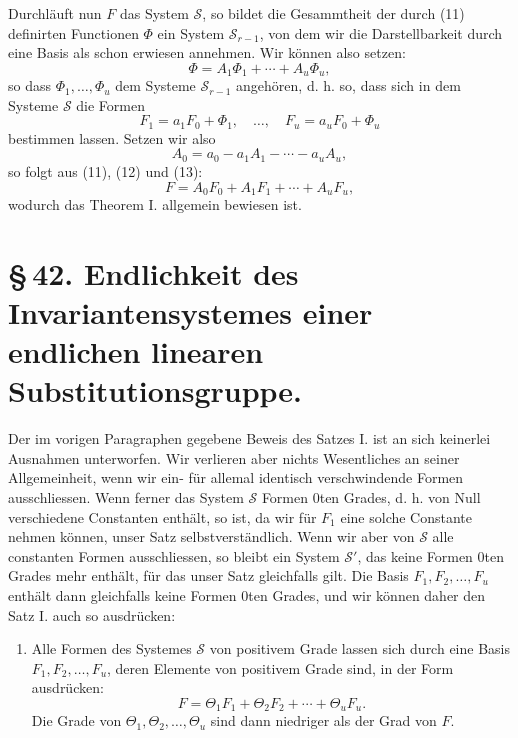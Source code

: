 \documentclass[11pt]{article}
\begin{document}
Durchläuft nun $F$ das System $\mathcal S$, so bildet die Gesammtheit der durch (11) definirten Functionen $\Phi$ ein System $\mathcal S_{r-1}$, von dem wir die Darstellbarkeit durch eine Basis als schon erwiesen annehmen. Wir können also setzen:
\begin{equation}
\Phi=A_1\Phi_1+\cdots+A_u\Phi_u,
\tag{12}
\end{equation}
so dass $\Phi_1,\ldots,\Phi_u$ dem Systeme $\mathcal S_{r-1}$ angehören, d. h. so, dass sich in dem Systeme $\mathcal S$ die Formen
\begin{equation}
F_1=a_1F_0+\Phi_1,
\quad\ldots,\quad
F_u=a_uF_0+\Phi_u
\tag{13}
\end{equation}
bestimmen lassen. Setzen wir also
\begin{equation}
A_0=a_0-a_1A_1-\cdots-a_uA_u,
\tag{14}
\end{equation}
so folgt aus (11), (12) und (13):
\begin{equation}
F=A_0F_0+A_1F_1+\cdots+A_uF_u,
\tag{15}
\end{equation}
wodurch das Theorem I. allgemein bewiesen ist.

\section*{\S\,42. Endlichkeit des Invariantensystemes einer endlichen linearen Substitutionsgruppe.}

Der im vorigen Paragraphen gegebene Beweis des Satzes I. ist an sich keinerlei Ausnahmen unterworfen. Wir verlieren aber nichts Wesentliches an seiner Allgemeinheit, wenn wir ein- für allemal identisch verschwindende Formen ausschliessen. Wenn ferner das System $\mathcal S$ Formen $0$ten Grades, d. h. von Null verschiedene Constanten enthält, so ist, da wir für $F_1$ eine solche Constante nehmen können, unser Satz selbstverständlich. Wenn wir aber von $\mathcal S$ alle constanten Formen ausschliessen, so bleibt ein System $\mathcal S'$, das keine Formen $0$ten Grades mehr enthält, für das unser Satz gleichfalls gilt. Die Basis $F_1,F_2,\ldots,F_u$ enthält dann gleichfalls keine Formen $0$ten Grades, und wir können daher den Satz I. auch so ausdrücken:

\begin{enumerate}[label=\Roman*.,leftmargin=2.4em,start=2]
\item Alle Formen des Systemes $\mathcal S$ von positivem Grade lassen sich durch eine Basis $F_1,F_2,\ldots,F_u$, deren Elemente von positivem Grade sind, in der Form ausdrücken:
\begin{equation}
F=\Theta_1F_1+\Theta_2F_2+\cdots+\Theta_uF_u.
\tag{1}
\end{equation}
Die Grade von $\Theta_1,\Theta_2,\ldots,\Theta_u$ sind dann niedriger als der Grad von $F$.
\end{enumerate}
\end{document}
